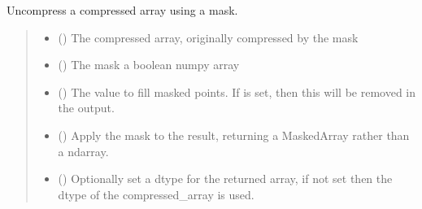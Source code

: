 \documentclass[letterpaper,10pt,english]{sphinxmanual}
\begin{document}

\begin{fulllineitems}
\label{\detokenize{misc:glomar_gridding.utils.uncompress_masked}}
\pysigstartsignatures
\pysiglinewithargsret
{}
{\sphinxparamcomma {}\sphinxparamcomma {}\sphinxparamcomma {}\sphinxparamcomma {}}
{}
\pysigstopsignatures
\sphinxAtStartPar
Un\sphinxhyphen{}compress a compressed array using a mask.
\begin{quote}\begin{description}
\begin{itemize}
\item {}
\sphinxAtStartPar
{} () \textendash{} The compressed array, originally compressed by the mask

\item {}
\sphinxAtStartPar
{} () \textendash{} The mask \sphinxhyphen{} a boolean numpy array

\item {}
\sphinxAtStartPar
{} () \textendash{} The value to fill masked points. If  is set, then this will
be removed in the output.

\item {}
\sphinxAtStartPar
{} () \textendash{} Apply the mask to the result, returning a MaskedArray rather than a
ndarray.

\item {}
\sphinxAtStartPar
{} () \textendash{} Optionally set a dtype for the returned array, if not set then the
dtype of the compressed\_array is used.


\end{itemize}
\end{description}
\end{quote}
\end{fulllineitems}
\end{document}
